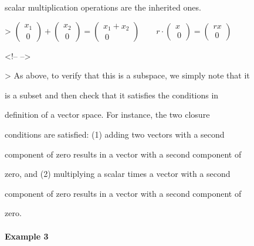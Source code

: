     scalar multiplication operations are the inherited ones.



    >   $\begin{pmatrix} x_1 \\\     0 \end{pmatrix}

        +

        \begin{pmatrix} x_2 \\\         0 \end{pmatrix}

        =

        \begin{pmatrix} x_1+x_2 \\\         0 \end{pmatrix}

        \qquad

        r\cdot\begin{pmatrix} x \\\         0 \end{pmatrix}

        =\begin{pmatrix} rx \\\         0 \end{pmatrix}$



<!-- -->



>   As above, to verify that this is a subspace, we simply note that it

    is a subset and then check that it satisfies the conditions in

    definition of a vector space. For instance, the two closure

    conditions are satisfied: (1) adding two vectors with a second

    component of zero results in a vector with a second component of

    zero, and (2) multiplying a scalar times a vector with a second

    component of zero results in a vector with a second component of

    zero.



\paragraph{Example 3}



